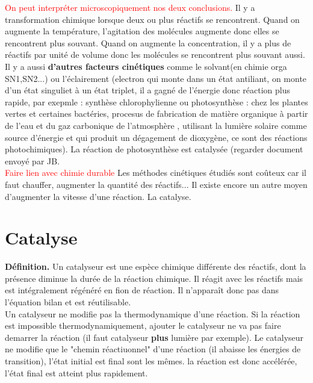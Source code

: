 \documentclass{article}
\begin{document}
\textcolor{red}{On peut interpréter microscopiquement nos deux conclusions.} Il y a transformation chimique lorsque deux ou plus réactifs se rencontrent. Quand on augmente la température, l'agitation des molécules augmente donc elles se rencontrent plus souvant. Quand on augmente la concentration, il y a plus de réactifs par unité de volume donc les molécules se rencontrent plus souvant aussi.\\

Il y a aussi \textbf{d'autres facteurs cinétiques} comme le solvant(en chimie orga SN1,SN2...) ou l'éclairement (electron qui monte dans un état antiliant, on monte d'un état singuliet à un état triplet, il a gagné de l'énergie donc réaction plus rapide, par exepmle : synthèse chlorophylienne ou photosynthèse : chez les plantes vertes et certaines bactéries, procesus de fabrication de matière organique à partir de l'eau et du gaz carbonique de l'atmosphère , utilisant la lumière solaire comme source d'énergie et qui produit un dégagement de dioxygène, ce sont des réactions photochimiques). La réaction de photosynthèse est catalysée (regarder document envoyé par JB.\\


\textcolor{red}{Faire lien avec chimie durable}
Les méthodes cinétiques étudiés sont coûteux car il faut chauffer, augmenter la quantité des réactifs... Il existe encore un autre moyen d'augmenter la vitesse d'une réaction. La catalyse.

\section{Catalyse}

\textbf{Définition.} Un catalyseur est une espèce chimique différente des réactifs, dont la présence diminue la durée de la réaction chimique. Il réagit avec les réactifs mais est intégralement régénéré en fion de réaction. Il n'apparaît donc pas dans l'équation bilan et est réutilisable.\\

Un catalyseur ne modifie pas la thermodynamique d'une réaction. Si la réaction est impossible thermodynamiquement, ajouter le catalyseur ne va pas faire demarrer la réaction (il faut catalyseur \textbf{plus} lumière par exemple). Le catalyseur ne modifie que le "chemin réactiuonnel" d'une réaction (il abaisse les énergies de transition), l'état initial est final sont les mêmes. la réaction est donc accélérée, l'état final est atteint plus rapidement.\\
\end{document}

